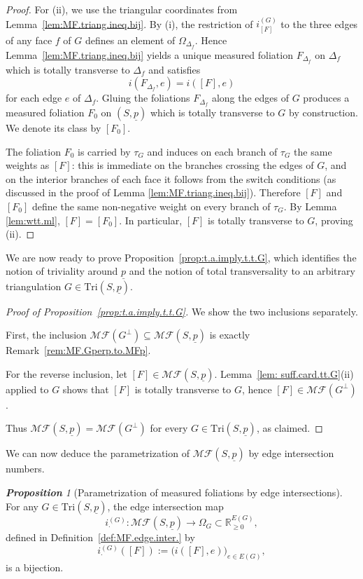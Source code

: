 \documentclass[11pt, letterpaper]{amsart}
\theoremstyle{definition}
\theoremstyle{remark}
\newtheorem{proposition}[theorem]{\rm\bf Proposition}
\newcommand{\up}{\underline{p}}
\newcommand{\Sp}{(S,\up)}
\newcommand{\TSp}{\text{Tri}\Sp}
\newcommand{\iG}{i^{(G)}}
\newcommand{\OG}{\Omega_{G}}
\newcommand{\cMF}{\mathcal{MF}}
\newcommand{\cMFp}{\mathcal{MF} (S,\up)}
\newcommand{\bR}{\mathbb{R}}
\numberwithin{equation}{section}
\begin{document}
\begin{proof}
For (ii), we use the triangular coordinates from Lemma~\ref{lem:MF.triang.ineq.bij}.
By (i), the restriction of \(i^{(G)}_{[F]}\) to the three edges of any face \(f\) of \(G\) defines an element of \(\Omega_{\Delta_f}\).
Hence Lemma~\ref{lem:MF.triang.ineq.bij} yields a unique measured foliation \(F_{\Delta_f}\) on \(\Delta_f\) which is totally transverse to \(\Delta_f\) and satisfies
\[
i(F_{\Delta_f},e) = i([F],e)
\]
for each edge \(e\) of \(\Delta_f\).
Gluing the foliations \(F_{\Delta_f}\) along the edges of \(G\) produces a measured foliation \(F_0\) on \(\Sp\) which is totally transverse to \(G\) by construction.
We denote its class by \([F_0]\).

The foliation \(F_0\) is carried by \(\tau_G\) and induces on each branch of \(\tau_G\) the same weights as \([F]\): this is immediate on the branches crossing the edges of \(G\), and on the interior branches of each face it follows from the switch conditions (as discussed in the proof of Lemma \ref{lem:MF.triang.ineq.bij}). Therefore \([F]\) and \([F_0]\) define the same non-negative weight on every branch of \(\tau_G\).
By Lemma \ref{lem:wtt.ml}, \([F] = [F_0]\).
In particular, \([F]\) is totally transverse to \(G\), proving (ii).
\end{proof}

We are now ready to prove Proposition~\ref{prop:t.a.imply.t.t.G}, which identifies the notion of triviality around \(\up\) and the notion of total transversality to an arbitrary triangulation $G\in\TSp$.

\begin{proof}[Proof of Proposition~\ref{prop:t.a.imply.t.t.G}]
We show the two inclusions separately.

First, the inclusion \(\cMF(G^{\perp}) \subseteq \cMFp\) is exactly Remark~\ref{rem:MF.Gperp.to.MFp}.


For the reverse inclusion, let \([F]\in\cMFp\).
Lemma~\ref{lem: suff.card.tt.G}(ii) applied to \(G\) shows that \([F]\) is totally transverse to \(G\), hence \([F]\in\cMF(G^{\perp})\).

Thus \(\cMFp = \cMF(G^{\perp})\) for every \(G\in\TSp\), as claimed.
\end{proof}

We can now deduce the parametrization of \(\cMFp\) by edge intersection numbers.

\begin{proposition}[Parametrization of measured foliations by edge intersections]
\label{prop:edge.length.MF.biject.}
For any \(G\in\TSp\), the edge intersection map
\[
\iG_{\cdot} : \cMFp \longrightarrow \OG \subset \bR^{E(G)}_{\geq 0},
\]
defined in Definition~\ref{def:MF.edge.inter.} by
\[
\iG_{\cdot}([F]) := \big(i([F],e)\big)_{e\in E(G)},
\]
is a bijection.
\end{proposition}
\end{document}
